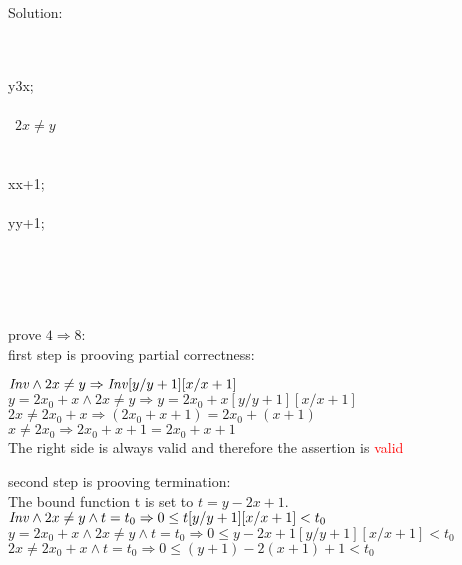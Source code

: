 \documentclass[a4paper]{scrartcl}
\begin{document}
Solution:\\
\begin{center}
  \begin{ALG}
    \\
    \\
    \ASS y{3x};\\
    \\
    \WHILE\ $2x\neq y$\ \DO\\
    \>\\
    \>\\
    \>\ASS x{x+1};\\
    \>\\
    \>\ASS y{y+1};\\
    \>\\
    \OD\\
    \\
    \\
  \end{ALG}
\end{center}
prove $4 \Rightarrow 8$:\\
first step is prooving partial correctness:\\
\begin{center}
$\mathit{Inv} \land 2x \neq y \Rightarrow \mathit{Inv} [y/y+1][x/x+1]$\\
$y = 2x_0 + x \land 2x \neq y \Rightarrow y = 2x_0 + x [y/y+1][x/x+1]$\\
$2x \neq 2x_0 + x \Rightarrow (2x_0 + x + 1) = 2x_0 + (x+1)$\\
$x \neq 2x_0 \Rightarrow 2x_0 + x + 1 = 2x_0 + x+1$\\
The right side is always valid and therefore the assertion is \textcolor{red}{valid}
\end{center} 
second step is prooving termination:\\
The bound function t is set to $t = y - 2x + 1$.\\
$\mathit{Inv} \land 2x \neq y \land t = t_0 \Rightarrow 0 \leq t[y/y+1][x/x+1] < t_0$\\
$y = 2x_0 + x \land 2x \neq y \land t = t_0 \Rightarrow 0 \leq y - 2x + 1[y/y+1][x/x+1] < t_0$\\
$2x \neq 2x_0 + x \land t = t_0 \Rightarrow 0 \leq (y + 1) - 2(x + 1) + 1 < t_0$\\
\end{document}
